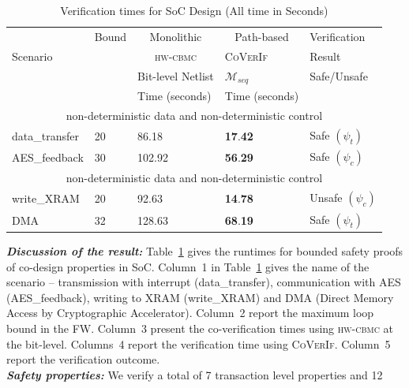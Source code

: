 \documentclass[sigconf]{acmart}
\newcommand{\tool}[1]{\textsc{#1}\xspace}
\newcommand{\hwcbmcv}{\tool{hw-cbmc}}
\newcommand{\verifox}{\tool{CoVerIf}}
\begin{document}
\begin{table}
\begin{center}
{
\begin{scriptsize}
\begin{tabular}{|l|l|l|l|l|}
\hline
  & Bound & \multicolumn{1}{c|}{Monolithic} & \multicolumn{1}{c|}{Path-based} &
  Verification \\ 
\cline{3-4}
  Scenario &  & \multicolumn{1}{c|}{\hwcbmcv} & \verifox & Result \\ 
\cline{3-5}
      &       & Bit-level Netlist & $\mathcal{M}_{seq}$ & Safe/Unsafe \\
\cline{1-5}
      &       &   Time (seconds)       & Time (seconds) &  \\
\cline{1-5}      
\multicolumn{5}{|c|}{non-deterministic data and non-deterministic control} \\ \hline
  data\_transfer & 20 & 86.18 & \textbf{17}.\textbf{42} & Safe $(\psi_{t})$ \\
  \hline
  AES\_feedback & 30 & 102.92 & \textbf{56}.\textbf{29} & Safe $(\psi_{c})$ \\ 
\hline
\multicolumn{5}{|c|}{non-deterministic data and non-deterministic control} \\ \hline
  write\_XRAM & 20 & 92.63 & \textbf{14}.\textbf{78} & Unsafe $(\psi_{c})$ \\ 
\hline
  DMA & 32 & 128.63 & \textbf{68}.\textbf{19} & Safe $(\psi_{t})$ \\ 
\hline
\end{tabular}
\end{scriptsize}
}
\end{center}
  \caption{Verification times for SoC Design (All time in Seconds)
\label{table:SoC}}
\end{table}
%
\textbf{\emph{Discussion of the result:}}
%
Table~\ref{table:SoC} gives the runtimes for bounded safety proofs of 
co-design properties in SoC.  Column~1 in
Table~\ref{table:SoC} gives the name of the scenario -- transmission with
interrupt (data\_transfer), communication with AES (AES\_feedback), writing to 
XRAM (write\_XRAM) and DMA (Direct Memory Access by Cryptographic Accelerator).  
Column~2 report the maximum loop bound in the FW.  Column~3 present the 
co-verification times using \hwcbmcv at the bit-level.  Columns~4 report 
the verification time using \verifox. Column~5 report the verification outcome. \\
\textbf{\emph{Safety properties:}}
%
We verify a total of 7 transaction level properties and 12 
\end{document}

